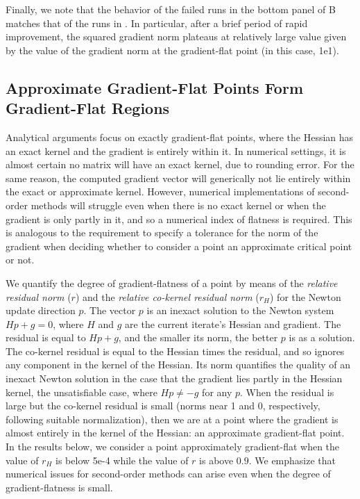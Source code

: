\documentclass[../../thesis.tex]{subfiles}
\begin{document}
Finally, we note that the behavior of the failed runs
in the bottom panel of B
matches that of the runs in .
In particular, after a brief period of rapid improvement,
the squared gradient norm plateaus at relatively large value
given by the value of the gradient norm at the gradient-flat point
(in this case, 1e1).

\subsection{Approximate Gradient-Flat Points Form Gradient-Flat Regions}%
Analytical arguments focus on exactly gradient-flat points,
where the Hessian has an exact kernel
and the gradient is entirely within it.
In numerical settings,
it is almost certain no matrix will have an exact kernel,
due to rounding error.
For the same reason, the computed gradient vector will generically not lie entirely
within the exact or approximate kernel.
However, numerical implementations of second-order methods
will struggle even when there is no exact kernel
or when the gradient is only partly in it,
and so a numerical index of flatness is required.
This is analogous to the requirement to specify a tolerance
for the norm of the gradient when deciding whether to consider a point
an approximate critical point or not.

We quantify the degree of gradient-flatness of a point
by means of
the \emph{relative residual norm} ($r$)
and the \emph{relative co-kernel residual norm} ($r_H$)
for the Newton update direction $p$.
The vector $p$ is an inexact solution to the Newton system $Hp + g = 0$,
where $H$ and $g$ are the current iterate's Hessian and gradient.
The residual is equal to $Hp + g$,
and the smaller its norm, the better $p$ is as a solution.
The co-kernel residual is equal to the Hessian times the residual,
and so ignores any component in the kernel of the Hessian.
Its norm quantifies the quality of an inexact Newton solution
in the case that the gradient lies partly in the Hessian kernel,
the unsatisfiable case, where $Hp \neq -g$ for any $p$.
When the residual is large but the co-kernel residual is small
(norms near 1 and 0, respectively, following suitable normalization),
then we are at a point where
the gradient is almost entirely in the kernel of the Hessian:
an approximate gradient-flat point.
In the results below, we consider a point approximately gradient-flat
when the value of $r_H$ is below 5e-4
while the value of $r$ is above $0.9$.
We emphasize that numerical issues for second-order methods
can arise even when the degree of gradient-flatness
is small.
\end{document}
